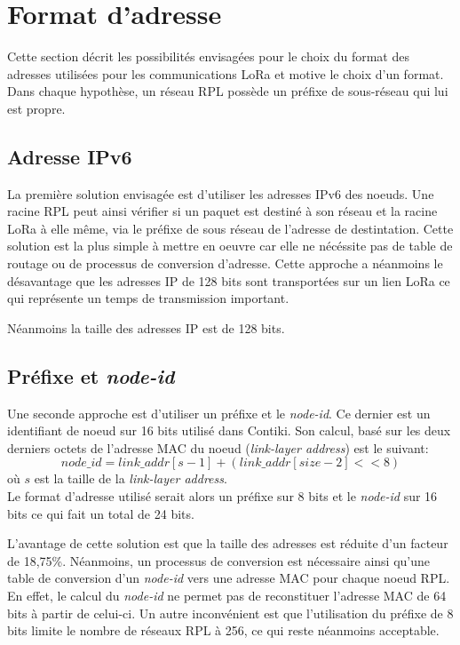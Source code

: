 \section{Format d'adresse}\label{sec:archi-adresses}
\renewcommand{\rightmark}{Format d'adresse}

Cette section décrit les possibilités envisagées pour le choix du format des adresses utilisées pour les communications LoRa et motive le choix d'un format. Dans chaque hypothèse, un réseau RPL possède un préfixe de sous-réseau qui lui est propre.

\subsection*{Adresse IPv6}
    La première solution envisagée est d'utiliser les adresses IPv6 des noeuds.
    Une racine RPL peut ainsi vérifier si un paquet est destiné à son réseau et la racine LoRa à elle même,
    via le préfixe de sous réseau de l'adresse de destintation.
    Cette solution est la plus simple à mettre en oeuvre car elle ne nécéssite pas de table de routage ou de processus de conversion d'adresse. Cette approche a néanmoins le désavantage que les adresses IP de 128 bits sont transportées sur un lien LoRa ce qui représente un temps de transmission important.
    
    Néanmoins la taille des adresses IP est de 128 bits.

\subsection*{Préfixe et \textit{node-id}}
    Une seconde approche est d'utiliser un préfixe et le \textit{node-id}. Ce dernier est un identifiant de noeud sur 16 bits utilisé dans Contiki. Son calcul, basé sur les deux derniers octets de l'adresse MAC du noeud (\textit{link-layer address}) est le suivant:
    \[
        node\_id = link\_addr[s-1] + (link\_addr[size -2] << 8)
    \]
    où $s$ est la taille de la \textit{link-layer address}.\\

    Le format d'adresse utilisé serait alors un préfixe sur 8 bits et le \textit{node-id} sur 16 bits ce qui fait un total de 24 bits.

    L'avantage de cette solution est que la taille des adresses est réduite d'un facteur de 18,75\%. Néanmoins, un processus de conversion est nécessaire ainsi qu'une table de conversion d'un \textit{node-id} vers une adresse MAC pour chaque noeud RPL. En effet, le calcul du \textit{node-id} ne permet pas de reconstituer l'adresse MAC de 64 bits à partir de celui-ci.
    Un autre inconvénient est que l'utilisation du préfixe de 8 bits limite le nombre de réseaux RPL à 256, ce qui reste néanmoins acceptable.

